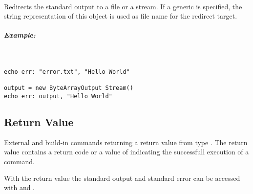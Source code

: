 \paragraph{}

Redirects the standard output to a
file or a stream. If a generic  is specified, the string
representation of this object is used as file name for the redirect target.

\subparagraph{Example:}
~

\begin{lstlisting}[style=Groovybash, label={lst:example_cd}]
echo err: "error.txt", "Hello World"

output = new ByteArrayOutput Stream()
echo err: output, "Hello World"
\end{lstlisting}

\subsection{Return Value}

External and build-in commands returning a return value from type
. The return value contains a return code or a value of
 indicating the successfull execution of a command.

With the return value the standard output and standard error can be accessed
with  and .

